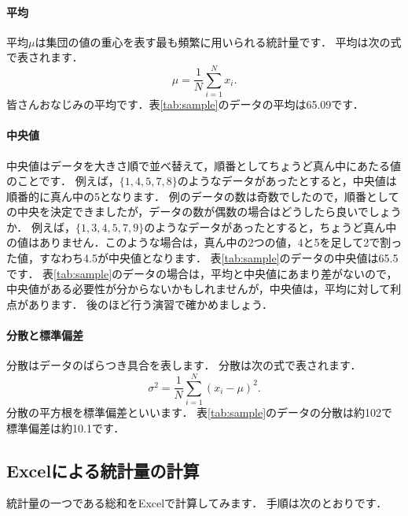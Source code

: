 \paragraph{平均}
平均$\mu$は集団の値の重心を表す最も頻繁に用いられる統計量です．
平均は次の式で表されます．
\begin{equation}
    \mu = \frac{1}{N} \sum_{i=1}^{N} x_i.
\end{equation}
皆さんおなじみの平均です．表\ref{tab:sample}のデータの平均は65.09です．


\paragraph{中央値}
中央値はデータを大きさ順で並べ替えて，順番としてちょうど真ん中にあたる値のことです．
例えば，$\{1, 4, 5, 7, 8\}$のようなデータがあったとすると，中央値は順番的に真ん中の5となります．
例のデータの数は奇数でしたので，順番としての中央を決定できましたが，データの数が偶数の場合はどうしたら良いでしょうか．
例えば，$\{1,3,4,5,7,9\}$のようなデータがあったとすると，ちょうど真ん中の値はありません．このような場合は，真ん中の2つの値，4と5を足して2で割った値，すなわち4.5が中央値となります．
表\ref{tab:sample}のデータの中央値は65.5です．
表\ref{tab:sample}のデータの場合は，平均と中央値にあまり差がないので，中央値がある必要性が分からないかもしれませんが，中央値は，平均に対して利点があります．
後のほど行う演習で確かめましょう．

\paragraph{分散と標準偏差}
分散はデータのばらつき具合を表します．
分散は次の式で表されます．
\begin{equation}
    \sigma^2 = \frac{1}{N} \sum_{i=1}^{N} (x_i - \mu)^2.
\end{equation}
分散の平方根を標準偏差といいます．
表\ref{tab:sample}のデータの分散は約102で標準偏差は約10.1です．


\subsection{Excelによる統計量の計算}

統計量の一つである総和をExcelで計算してみます．
手順は次のとおりです．

